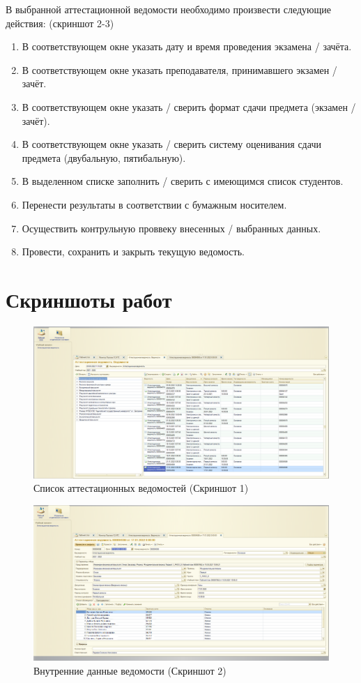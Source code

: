 \documentclass[12pt,a4paper]{article}
\begin{document}
В выбранной аттестационной ведомости необходимо произвести следующие действия: (скриншот 2-3)
\begin{enumerate}
 			\item В соответствующем окне указать дату и время проведения экзамена / зачёта.
            \item В соответствующем окне указать преподавателя, принимавшего экзамен / зачёт.
            \item В соответствующем окне указать / сверить формат сдачи предмета (экзамен / зачёт).
            \item В соответствующем окне указать / сверить систему оценивания сдачи предмета (двубальную, пятибальную).
			\item В выделенном списке заполнить / сверить с имеющимся список студентов.
            \item Перенести  результаты в соответствии с бумажным носителем.
  			\item Осуществить контрульную проввеку внесенных / выбранных данных.
            \item Провести, сохранить и закрыть текущую ведомость.
\end{enumerate}

\newpage
\section{Скриншоты работ}
\label{sec:picexample}
\begin{figure}[h]
 \centering
 \includegraphics[width=0.9 \textwidth]{Pic3.png}
 \caption{Список аттестационных ведомостей (Скриншот 1)}\label{fig:par}
\end{figure}

\begin{figure}[h]
 \centering
 \includegraphics[width=0.9 \textwidth]{Pic2.png}
 \caption{Внутренние данные ведомости (Скриншот 2)}\label{fig:par}
\end{figure}
\end{document}

